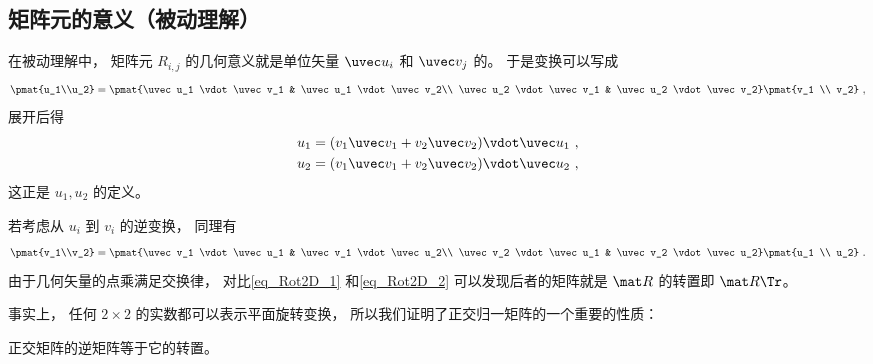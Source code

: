\subsection{矩阵元的意义（被动理解）}
在被动理解中， 矩阵元 $R_{i,j}$ 的几何意义就是单位矢量 $\uvec u_i$ 和 $\uvec v_j$ 的。 于是变换可以写成
\begin{equation}\label{eq_Rot2D_1}
\pmat{u_1\\u_2} = \pmat{\uvec u_1 \vdot \uvec v_1 & \uvec u_1 \vdot \uvec v_2\\ \uvec u_2 \vdot \uvec v_1 & \uvec u_2 \vdot \uvec v_2} \pmat{v_1 \\ v_2}~,
\end{equation}
展开后得
\begin{equation}
\begin{aligned}
&u_1 = (v_1 \uvec v_1 + v_2 \uvec v_2) \vdot \uvec u_1~,\\
&u_2 = (v_1 \uvec v_1 + v_2 \uvec v_2) \vdot \uvec u_2~,
\end{aligned}
\end{equation}
这正是 $u_1, u_2$ 的定义。

若考虑从 $u_i$ 到 $v_i$ 的逆变换， 同理有
\begin{equation}\label{eq_Rot2D_2}
\pmat{v_1\\v_2} = \pmat{\uvec v_1 \vdot \uvec u_1 & \uvec v_1 \vdot \uvec u_2\\ \uvec v_2 \vdot \uvec u_1 & \uvec v_2 \vdot \uvec u_2} \pmat{u_1 \\ u_2}~.
\end{equation}
由于几何矢量的点乘满足交换律， 对比\autoref{eq_Rot2D_1} 和\autoref{eq_Rot2D_2} 可以发现后者的矩阵就是 $\mat R$ 的转置即 $\mat R\Tr$。

事实上， 任何 $2\times2$ 的实数都可以表示平面旋转变换， 所以我们证明了正交归一矩阵的一个重要的性质：
\begin{theorem}{}
正交矩阵的逆矩阵等于它的转置。
\end{theorem}
